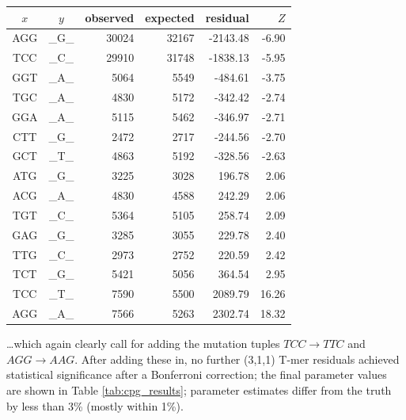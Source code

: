 \documentclass{article}
\newcommand{\nA}{\mbox{A}}  %
\newcommand{\nC}{\mbox{C}}
\newcommand{\nG}{\mbox{G}}
\newcommand{\nT}{\mbox{T}}
\theoremstyle{plain}
\theoremstyle{definition}
\begin{document}
    \begin{center}
        \begin{tabular}{ccrrrr}
            \hline
                $x$ & $y$ & observed &   expected &    residual &  $Z$ \\
                \hline
                \nA\nG\nG  &  \_\nG\_  &  30024  &  32167  &  -2143.48  &  -6.90 \\
                \nT\nC\nC  &  \_\nC\_  &  29910  &  31748  &  -1838.13  &  -5.95 \\
                \nG\nG\nT  &  \_\nA\_  &   5064  &   5549  &   -484.61  &  -3.75 \\
                \nT\nG\nC  &  \_\nA\_  &   4830  &   5172  &   -342.42  &  -2.74 \\
                \nG\nG\nA  &  \_\nA\_  &   5115  &   5462  &   -346.97  &  -2.71 \\
                \nC\nT\nT  &  \_\nG\_  &   2472  &   2717  &   -244.56  &  -2.70 \\
                \nG\nC\nT  &  \_\nT\_  &   4863  &   5192  &   -328.56  &  -2.63 \\
                \hline
                \nA\nT\nG  &  \_\nG\_  &   3225  &   3028  &    196.78  &   2.06  \\
                \nA\nC\nG  &  \_\nA\_  &   4830  &   4588  &    242.29  &   2.06  \\
                \nT\nG\nT  &  \_\nC\_  &   5364  &   5105  &    258.74  &   2.09  \\
                \nG\nA\nG  &  \_\nG\_  &   3285  &   3055  &    229.78  &   2.40  \\
                \nT\nT\nG  &  \_\nC\_  &   2973  &   2752  &    220.59  &   2.42  \\
                \nT\nC\nT  &  \_\nG\_  &   5421  &   5056  &    364.54  &   2.95  \\
                \nT\nC\nC  &  \_\nT\_  &   7590  &   5500  &   2089.79  &  16.26  \\
                \nA\nG\nG  &  \_\nA\_  &   7566  &   5263  &   2302.74  &  18.32  \\
                \hline
        \end{tabular}
    \end{center}
\ldots which again clearly call for adding the mutation tuples $TCC \to TTC$ and $AGG \to AAG$.
After adding these in,
no further (3,1,1) T-mer residuals achieved
statistical significance after a Bonferroni correction;
the final parameter values are shown in Table \ref{tab:cpg_results};
parameter estimates differ from the truth by less than 3\% (mostly within 1\%).
\end{document}

